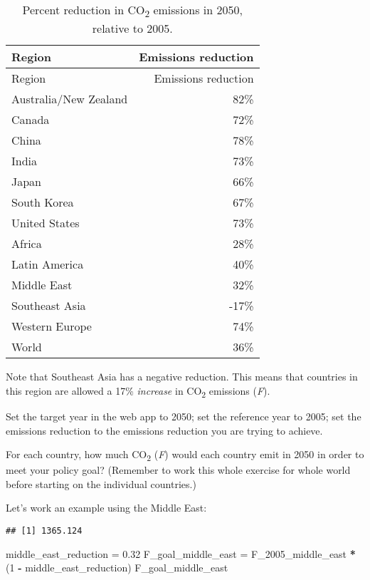 \documentclass[
]{article}
\newenvironment{Shaded}{\begin{snugshade}}{\end{snugshade}}
\newcommand{\DecValTok}[1]{\textcolor[rgb]{0.00,0.00,0.81}{#1}}
\newcommand{\FloatTok}[1]{\textcolor[rgb]{0.00,0.00,0.81}{#1}}
\newcommand{\KeywordTok}[1]{\textcolor[rgb]{0.13,0.29,0.53}{\textbf{#1}}}
\newcommand{\NormalTok}[1]{#1}
\newcommand{\OperatorTok}[1]{\textcolor[rgb]{0.81,0.36,0.00}{\textbf{#1}}}
\newcommand{\StringTok}[1]{\textcolor[rgb]{0.31,0.60,0.02}{#1}}
\begin{document}
\begin{enumerate}
  \begin{longtable}[]{@{}lr@{}}
  \caption{Percent reduction in CO\textsubscript{2} emissions in 2050,
  relative to 2005.}\tabularnewline
  \toprule
  Region & Emissions reduction\tabularnewline
  \midrule
  \endfirsthead
  \toprule
  Region & Emissions reduction\tabularnewline
  \midrule
  \endhead
  Australia/New Zealand & 82\%\tabularnewline
  Canada & 72\%\tabularnewline
  China & 78\%\tabularnewline
  India & 73\%\tabularnewline
  Japan & 66\%\tabularnewline
  South Korea & 67\%\tabularnewline
  United States & 73\%\tabularnewline
  Africa & 28\%\tabularnewline
  Latin America & 40\%\tabularnewline
  Middle East & 32\%\tabularnewline
  Southeast Asia & -17\%\tabularnewline
  Western Europe & 74\%\tabularnewline
  World & 36\%\tabularnewline
  \bottomrule
  \end{longtable}

  Note that Southeast Asia has a negative reduction. This means that
  countries in this region are allowed a 17\% \emph{increase} in
  CO\textsubscript{2} emissions (\emph{F}).

  Set the target year in the web app to 2050; set the reference year to
  2005; set the emissions reduction to the emissions reduction you are
  trying to achieve.

  For each country, how much CO\textsubscript{2} (\emph{F}) would each
  country emit in 2050 in order to meet your policy goal? (Remember to
  work this whole exercise for whole world before starting on the
  individual countries.)

  Let's work an example using the Middle East:

\begin{Shaded}
\end{Shaded}

\begin{verbatim}
## [1] 1365.124
\end{verbatim}

\begin{Shaded}
\begin{Highlighting}[]
\NormalTok{middle_east_reduction =}\StringTok{ }\FloatTok{0.32}
\NormalTok{F_goal_middle_east =}\StringTok{ }\NormalTok{F_}\DecValTok{2005}\NormalTok{_middle_east }\OperatorTok{*}\StringTok{ }\NormalTok{(}\DecValTok{1} \OperatorTok{-}\StringTok{ }\NormalTok{middle_east_reduction)}
\NormalTok{F_goal_middle_east}
\end{Highlighting}
\end{Shaded}


\end{enumerate}
\end{document}
